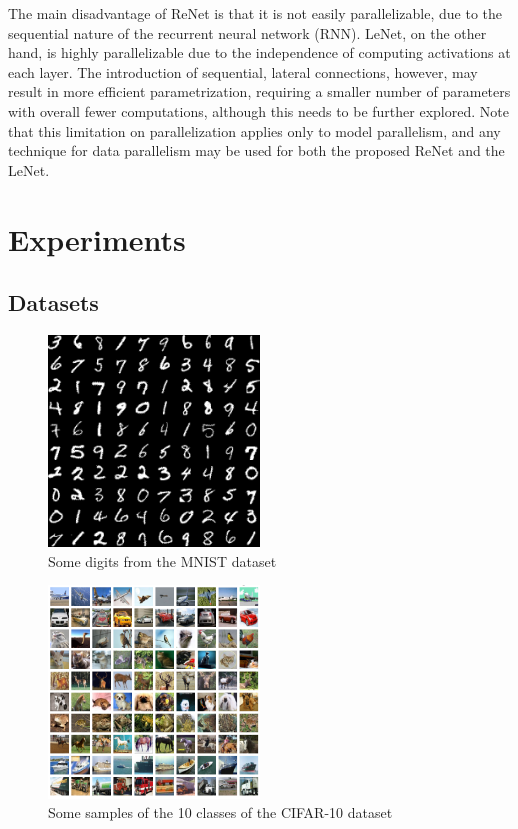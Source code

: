 The main disadvantage of ReNet is that it is not easily parallelizable, due to
the sequential nature of the recurrent neural network (RNN). LeNet, on the
other hand, is highly parallelizable due to the independence of computing
activations at each layer. The introduction of sequential, lateral connections,
however, may result in more efficient parametrization, requiring a smaller
number of parameters with overall fewer computations, although this needs to be
further explored. Note that this limitation on parallelization applies only to
model parallelism, and any technique for data parallelism may be used for both
the proposed ReNet and the LeNet.


\section{Experiments}\label{sec:renet_experiments}

\subsection{Datasets}

\begin{figure}[!t]
    \centering
    \includegraphics[width=0.5\textwidth]{img/renet/mnist_digits.png}
    \caption{Some digits from the MNIST dataset}
    \label{fig:mnist_digits}
\end{figure}

\begin{figure}[!t]
    \centering
    \includegraphics[width=0.5\textwidth]{img/renet/cifar-10.png}
    \caption{Some samples of the 10 classes of the CIFAR-10 dataset}
    \label{fig:cifar}
\end{figure}

